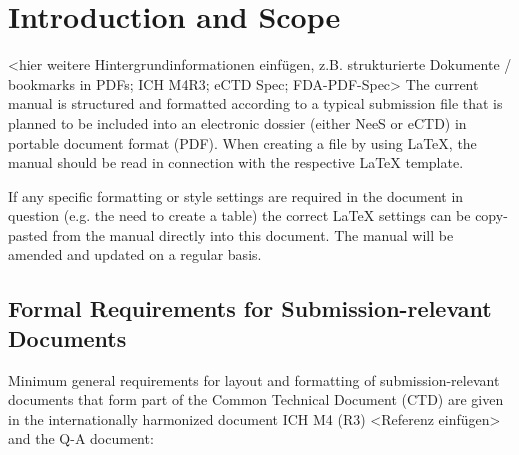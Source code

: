 \documentclass{pharmrep}
\begin{document}
\section{Introduction and Scope}
<hier weitere Hintergrundinformationen einfügen, z.B. strukturierte Dokumente / bookmarks in PDFs;
ICH M4R3; eCTD Spec; FDA-PDF-Spec>
The current manual is structured and formatted according to a typical submission file that is planned to
be included into an electronic dossier (either NeeS or eCTD) in portable document format (PDF). When
creating a file by using \LaTeX, the manual should be read in connection with the respective
\LaTeX{} template.

If any specific formatting or style settings are required in the document in question (e.g. the need to
create a table) the correct \LaTeX{} settings can be copy-pasted from the manual directly into this document.
The manual will be amended and updated on a regular basis.

\subsection{Formal Requirements for Submission-relevant Documents}
Minimum general requirements for layout and formatting of submission-relevant documents that form
part of the Common Technical Document (CTD) are
given in the internationally harmonized document ICH M4 (R3) <Referenz einfügen> and the Q-A
document:
\end{document}
